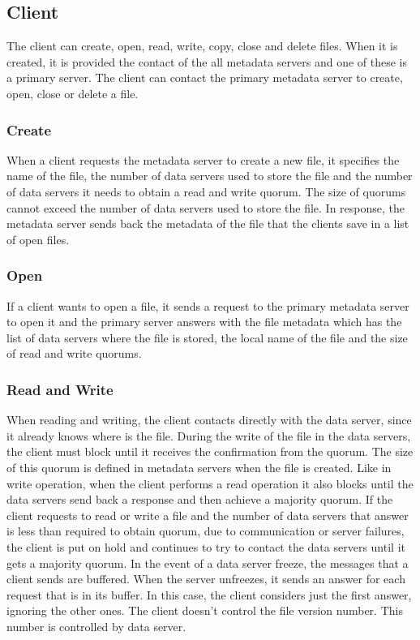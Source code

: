 \subsection{Client}

The client can create, open, read, write, copy, close and delete files. When
it is created, it is provided the contact of the all metadata servers
and one of these is a primary server. 
The client can contact the primary metadata server to create, open,
close or delete a file.

\subsubsection{Create} 

When a client requests the metadata server to create a new file, it
specifies the name of the file, the number of data servers used to
store the file and the number of data servers it needs to obtain a read
and write quorum. The size of quorums cannot exceed the number of data
servers used to store the file. In response, the metadata server sends back the
metadata of the file that the clients save in a list of open files.

\subsubsection{Open}

If a client wants to open a file, it sends a request to the primary
metadata server to open it and the primary server answers with the file
metadata which has the list of data servers where the file is stored, the local name
of the file and the size of read and write quorums.

\subsubsection{Read and Write}


When reading and writing, the client contacts directly with the data server,
since it already knows where is the file. During the write of
the file in the data servers, the client must block until it receives the
confirmation from the quorum. The size of this quorum is defined in
metadata servers when the file is created. Like in write operation, when the
client performs a read operation it also blocks until the data servers send 
back a response and then achieve a majority quorum.
If the client requests to read or write a file and the number of data
servers that answer is less than required to obtain quorum, due to
communication or server failures, the client is put on
hold and continues to try to contact the data servers until it gets a
majority quorum.
In the event of a data server freeze, the messages that a client sends are
buffered. When the server unfreezes, it sends an answer for each request
that is in its buffer. In this case, the client considers just the first
answer, ignoring the other ones.
The client doesn't control the file version number. This number is
controlled by data server.


